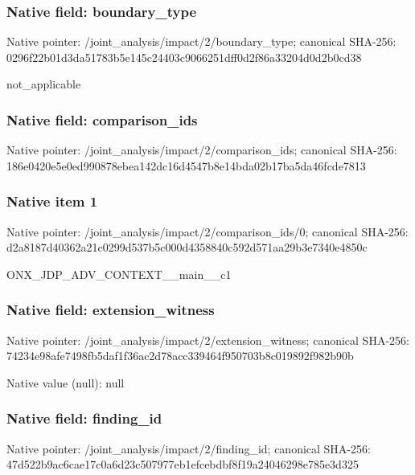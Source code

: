 \documentclass[10pt,a4paper]{article}
\begin{document}
\subsubsection{Native field: boundary\_\allowbreak{}type}
Native pointer: /joint\_\allowbreak{}analysis/impact/2/boundary\_\allowbreak{}type; canonical SHA-256: 0296f22b01d3da51783b5e145c24403c9066251dff0d2f86a33204d0d2b0cd38

\begingroup\raggedright\sloppy not\_\allowbreak{}applicable\par\endgroup

\subsubsection{Native field: comparison\_\allowbreak{}ids}
Native pointer: /joint\_\allowbreak{}analysis/impact/2/comparison\_\allowbreak{}ids; canonical SHA-256: 186e0420e5e0ed990878ebea142dc16d4547b8e14bda02b17ba5da46fcde7813

\subsubsection{Native item 1}
Native pointer: /joint\_\allowbreak{}analysis/impact/2/comparison\_\allowbreak{}ids/0; canonical SHA-256: d2a8187d40362a21c0299d537b5c000d4358840c592d571aa29b3e7340e4850c

\begingroup\raggedright\sloppy ONX\_\allowbreak{}JDP\_\allowbreak{}ADV\_\allowbreak{}CONTEXT\_\allowbreak{}\_\allowbreak{}main\_\allowbreak{}\_\allowbreak{}c1\par\endgroup

\subsubsection{Native field: extension\_\allowbreak{}witness}
Native pointer: /joint\_\allowbreak{}analysis/impact/2/extension\_\allowbreak{}witness; canonical SHA-256: 74234e98afe7498fb5daf1f36ac2d78acc339464f950703b8c019892f982b90b

Native value (null): null

\subsubsection{Native field: finding\_\allowbreak{}id}
Native pointer: /joint\_\allowbreak{}analysis/impact/2/finding\_\allowbreak{}id; canonical SHA-256: 47d522b9ac6cae17c0a6d23c507977eb1efcebdbf8f19a24046298e785e3d325
\end{document}
